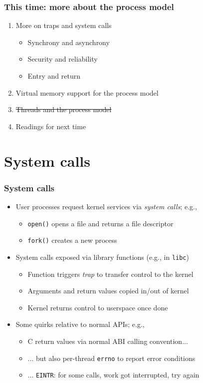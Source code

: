 \begin{frame}
  \frametitle{This time: more about the process model}

  \begin{enumerate}
    \item More on traps and system calls
    \begin{itemize}
      \item Synchrony and asynchrony
      \item Security and reliability
      \item Entry and return
    \end{itemize}
    \item Virtual memory support for the process model
    \item \sout{Threads and the process model}
    \item Readings for next time
  \end{enumerate}
\end{frame}

\section{System calls}

\begin{frame}
  \frametitle{System calls}

  \begin{itemize}
    \item User processes request kernel services via \textit{system calls};
      e.g.,
    \begin{itemize}
      \item \texttt{open()} opens a file and returns a file descriptor
      \item \texttt{fork()} creates a new process
    \end{itemize}

    \pause
    \medskip

    \item System calls exposed via library functions (e.g., in
      \texttt{libc})
    \begin{itemize}
      \item Function triggers \textit{trap} to transfer control to the kernel
      \item Arguments and return values copied in/out of kernel
      \item Kernel returns control to userspace once done
    \end{itemize}

    \pause
    \medskip

    \item Some quirks relative to normal APIs; e.g.,
    \begin{itemize}
      \item C return values via normal ABI calling convention...
      \item ... but also per-thread \texttt{errno} to report error conditions
      \item ... \texttt{EINTR}: for some calls, work got interrupted, try again
    \end{itemize}
  \end{itemize}
\end{frame}

